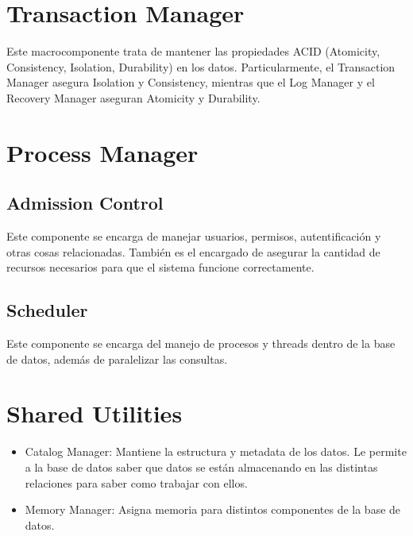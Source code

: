 \section{Transaction Manager}
Este macrocomponente trata de mantener las propiedades ACID (Atomicity, Consistency, Isolation, Durability) en los datos. Particularmente, el Transaction Manager asegura Isolation y Consistency, mientras que el Log Manager y el Recovery Manager aseguran Atomicity y Durability.

\section{Process Manager}
\subsection{Admission Control}
Este componente se encarga de manejar usuarios, permisos, autentificación y otras cosas relacionadas. También es el encargado de asegurar la cantidad de recursos necesarios para que el sistema funcione correctamente.

\subsection{Scheduler}
Este componente se encarga del manejo de procesos y threads dentro de la base de datos, además de paralelizar las consultas.

\section{Shared Utilities}
\begin{itemize}
  \item Catalog Manager: Mantiene la estructura y metadata de los datos. Le permite a la base de datos saber que datos se están almacenando en las distintas relaciones para saber como trabajar con ellos.
  \item Memory Manager: Asigna memoria para distintos componentes de la base de datos.
\end{itemize}

